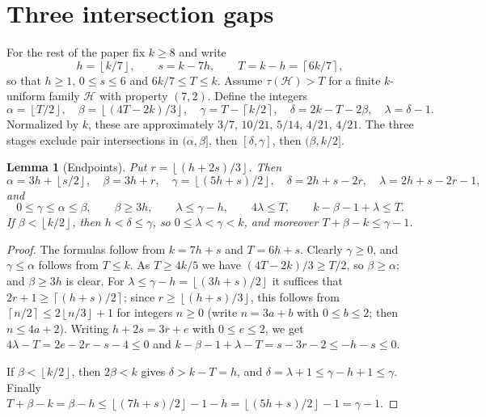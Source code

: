\documentclass[11pt]{article}
\numberwithin{equation}{section}
\newtheorem{lemma}[theorem]{Lemma}
\theoremstyle{definition}
\theoremstyle{remark}
\newcommand{\HH}{\mathcal H}
\newcommand{\ceil}[1]{\left\lceil #1\right\rceil}
\newcommand{\floor}[1]{\left\lfloor #1\right\rfloor}
\begin{document}
\section{Three intersection gaps}\label{sec:gaps}

For the rest of the paper fix $k\ge8$ and write
\[
 h=\floor{k/7},\qquad s=k-7h,\qquad T=k-h=\ceil{6k/7},
\]
so that $h\ge1$, $0\le s\le6$ and $6k/7\le T\le k$. Assume
$\tau(\HH)>T$ for a finite $k$-uniform family $\HH$ with property
$(7,2)$. Define the integers
\begin{equation}\label{eq:endpoints}
 \alpha=\floor{T/2},\quad \beta=\floor{(4T-2k)/3},\quad
 \gamma=T-\ceil{k/2},\quad \delta=2k-T-2\beta,\quad \lambda=\delta-1.
\end{equation}
Normalized by $k$, these are approximately $3/7$, $10/21$, $5/14$,
$4/21$, $4/21$. The three stages exclude pair intersections in
$(\alpha,\beta]$, then $[\delta,\gamma]$, then $(\beta,k/2]$.

\begin{lemma}[Endpoints]\label{lem:endpoints}
Put $r=\floor{(h+2s)/3}$. Then
\[
 \alpha=3h+\floor{s/2},\quad \beta=3h+r,\quad
 \gamma=\floor{(5h+s)/2},\quad \delta=2h+s-2r,\quad
 \lambda=2h+s-2r-1,
\]
and
\begin{equation}\label{eq:endpointfacts}
 0\le\gamma\le\alpha\le\beta,\qquad \beta\ge3h,\qquad
 \lambda\le\gamma-h,\qquad 4\lambda\le T,\qquad k-\beta-1+\lambda\le T .
\end{equation}
If $\beta<\floor{k/2}$, then $h<\delta\le\gamma$, so $0\le\lambda<\gamma<k$,
and moreover $T+\beta-k\le\gamma-1$.
\end{lemma}

\begin{proof}
The formulas follow from $k=7h+s$ and $T=6h+s$. Clearly $\gamma\ge0$, and
$\gamma\le\alpha$ follows from $T\le k$. As $T\ge4k/5$ we have
$(4T-2k)/3\ge T/2$, so $\beta\ge\alpha$; and $\beta\ge3h$ is clear. For
$\lambda\le\gamma-h=\floor{(3h+s)/2}$ it suffices that
$2r+1\ge\ceil{(h+s)/2}$; since $r\ge\floor{(h+s)/3}$, this follows from
$\ceil{n/2}\le2\floor{n/3}+1$ for integers $n\ge0$ (write $n=3a+b$ with
$0\le b\le2$; then $n\le4a+2$). Writing $h+2s=3r+e$ with $0\le e\le2$,
we get $4\lambda-T=2e-2r-s-4\le0$ and
$k-\beta-1+\lambda-T=s-3r-2\le-h-s\le0$.

If $\beta<\floor{k/2}$, then $2\beta<k$ gives $\delta>k-T=h$, and
$\delta=\lambda+1\le\gamma-h+1\le\gamma$. Finally
$T+\beta-k=\beta-h\le\floor{(7h+s)/2}-1-h=\floor{(5h+s)/2}-1=\gamma-1$.
\end{proof}
\end{document}
